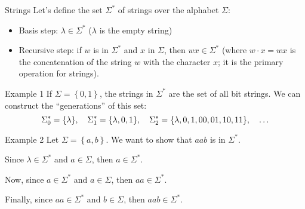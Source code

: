 \documentclass[a4paper]{article}
\begin{document}
\begin{parag}{Strings}
    Let's define the set $\Sigma^*$ of strings over the alphabet $\Sigma$: 
    \begin{itemize}
        \item Basis step: $\lambda \in \Sigma^*$ ($\lambda$ is the empty string)
        \item Recursive step: if $w$ is in $\Sigma^*$ and $x$ in $\Sigma$, then $wx \in \Sigma^*$ (where $w\cdot x = wx$ is the concatenation of the string $w$ with the character $x$; it is the primary operation for strings).
    \end{itemize}
    
\end{parag}

\begin{parag}{Example 1}
    If $\Sigma = \left\{0, 1\right\}$, the strings in $\Sigma^*$ are the set of all bit strings. We can construct the ``generations'' of this set:
    \[\Sigma_0^* = \left\{\lambda\right\}, \mathspace \Sigma_1^* = \left\{\lambda, 0, 1\right\}, \mathspace \Sigma_2^* = \left\{\lambda, 0, 1, 00, 01, 10, 11\right\}, \mathspace \ldots\]
\end{parag}

\begin{parag}{Example 2}
    Let $\Sigma = \left\{a, b\right\}$. We want to show that $aab$ is in $\Sigma^*$. 

    Since $\lambda \in \Sigma^*$ and $a \in \Sigma$, then $a \in \Sigma^*$.

    Now, since $a \in \Sigma^*$ and $a \in \Sigma$, then $aa \in \Sigma^*$.

    Finally, since $aa \in \Sigma^*$ and $b \in \Sigma$, then $aab \in \Sigma^*$.
\end{parag}
\end{document}
